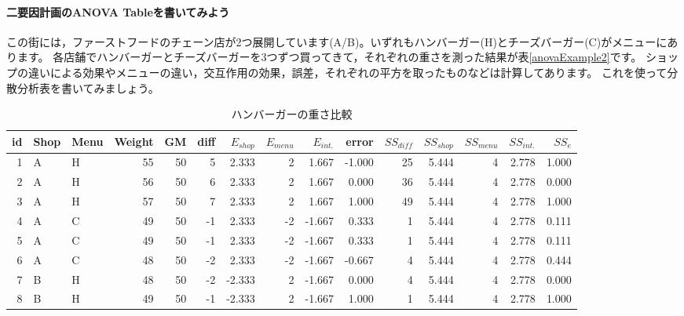 \documentclass{ltjbook}
\begin{document}
\paragraph{二要因計画のANOVA Tableを書いてみよう}
この街には，ファーストフードのチェーン店が2つ展開しています(A/B)。いずれもハンバーガー(H)とチーズバーガー(C)がメニューにあります。
各店舗でハンバーガーとチーズバーガーを3つずつ買ってきて，それぞれの重さを測った結果が表\ref{anovaExample2}です。
ショップの違いによる効果やメニューの違い，交互作用の効果，誤差，それぞれの平方を取ったものなどは計算してあります。
これを使って分散分析表を書いてみましょう。
\begin{landscape}
	\begin{table}[ht]
		\centering
		\caption{ハンバーガーの重さ比較}
		\begin{tabular}{rllrrrrrrrrrrrr}
			id & Shop & Menu & Weight & GM & diff & $E_{shop}$ & $E_{menu}$ & $E_{int.}$ & error  & $SS_{diff}$ & $SS_{shop}$ & $SS_{menu}$ & $SS_{int.}$ & $SS_{e}$ \\\hline\hline
			1  & A    & H    & 55     & 50 & 5    & 2.333      & 2          & 1.667      & -1.000 & 25          & 5.444       & 4           & 2.778       & 1.000    \\
			2  & A    & H    & 56     & 50 & 6    & 2.333      & 2          & 1.667      & 0.000  & 36          & 5.444       & 4           & 2.778       & 0.000    \\
			3  & A    & H    & 57     & 50 & 7    & 2.333      & 2          & 1.667      & 1.000  & 49          & 5.444       & 4           & 2.778       & 1.000    \\
			4  & A    & C    & 49     & 50 & -1   & 2.333      & -2         & -1.667     & 0.333  & 1           & 5.444       & 4           & 2.778       & 0.111    \\
			5  & A    & C    & 49     & 50 & -1   & 2.333      & -2         & -1.667     & 0.333  & 1           & 5.444       & 4           & 2.778       & 0.111    \\
			6  & A    & C    & 48     & 50 & -2   & 2.333      & -2         & -1.667     & -0.667 & 4           & 5.444       & 4           & 2.778       & 0.444    \\
			7  & B    & H    & 48     & 50 & -2   & -2.333     & 2          & -1.667     & 0.000  & 4           & 5.444       & 4           & 2.778       & 0.000    \\
			8  & B    & H    & 49     & 50 & -1   & -2.333     & 2          & -1.667     & 1.000  & 1           & 5.444       & 4           & 2.778       & 1.000    \\

\end{tabular}
\end{table}
\end{landscape}
\end{document}

